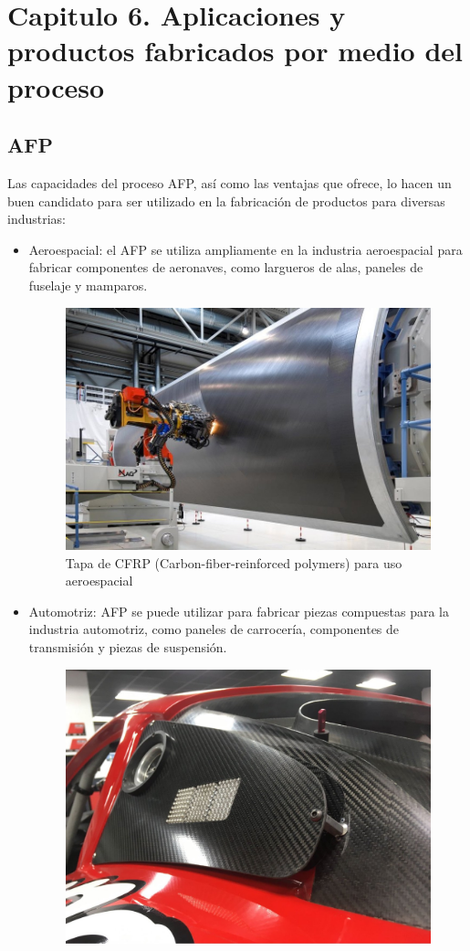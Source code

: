 \chapter{Capitulo 6. Aplicaciones y productos fabricados por medio del proceso}
\label{Punto 6. Aplicaciones}
\section{AFP}
Las capacidades del proceso AFP, así como las ventajas que ofrece, lo hacen un buen candidato para ser utilizado en la fabricación de productos para diversas industrias:
\begin{itemize}
    \item Aeroespacial: el AFP se utiliza ampliamente en la industria aeroespacial para fabricar componentes de aeronaves, como largueros de alas, paneles de fuselaje y mamparos.
    \begin{figure}[H]
        \centering
        \includegraphics[width=0.75\linewidth]{Fuselaje hecho con AFP.png}
        \caption{Tapa de CFRP (Carbon-fiber-reinforced polymers) para uso aeroespacial}
        \label{fig:enter-label}
    \end{figure}
    \item Automotriz: AFP se puede utilizar para fabricar piezas compuestas para la industria automotriz, como paneles de carrocería, componentes de transmisión y piezas de suspensión.
    \begin{figure}[H]
        \centering
        \includegraphics[width=0.5\linewidth]{Pieza de carroceria.png}

\end{figure}
\end{itemize}
